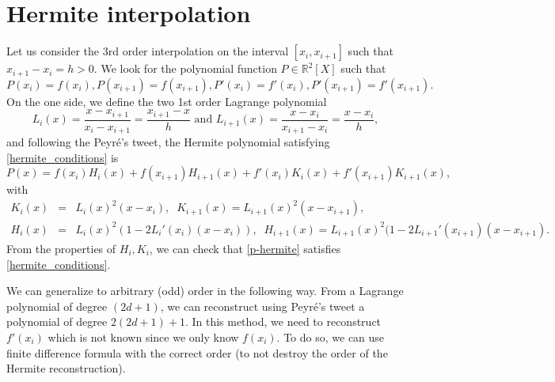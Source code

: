 \documentclass[12pt,english]{article}
\theoremstyle{plain}\newtheorem{theorem}{Theorem}[section]
\theoremstyle{plain}\newtheorem{corollary}{Corollary}[section]
\theoremstyle{plain}\newtheorem{lemma}{Lemma}[section]
\begin{document}
\section{Hermite interpolation}
\label{hemite}
Let us consider the 3rd order interpolation on the interval $[x_i, x_{i+1}]$ such that $x_{i+1}-x_i=h>0$. 
We look for the polynomial function $P\in \mathbb{R}^2[X]$ such that 
\begin{equation}
\label{hermite_conditions}
P(x_i) = f(x_i), P(x_{i+1}) = f(x_{i+1}), P'(x_i) = f'(x_i), P'(x_{i+1}) = f'(x_{i+1}).  
\end{equation} 
On the one side, we define the two 1st order Lagrange polynomial 
$$
L_i(x)=\frac{x-x_{i+1}}{x_i-x_{i+1}}  =\frac{x_{i+1}-x}{h}  \mbox{ and } L_{i+1}(x)=\frac{x-x_{i}}{x_{i+1}-x_{i}}=\frac{x-x_{i}}{h}, 
$$
and following the Peyr\'e's tweet, the Hermite polynomial satisfying \eqref{hermite_conditions} is 
\begin{equation}
\label{p-hermite}
P(x) = f(x_i)H_i(x) + f(x_{i+1})H_{i+1}(x)  + f'(x_i)K_i(x) + f'(x_{i+1})K_{i+1}(x),  
\end{equation}
with 
\begin{eqnarray}
\label{K_H}
K_i(x)&=&L_i(x)^2(x-x_i), \;\; K_{i+1}(x)=L_{i+1}(x)^2(x-x_{i+1}), \\
H_i(x)&=&L_i(x)^2(1-2L_i'(x_i)(x-x_i)), \;\; H_{i+1}(x)=L_{i+1}(x)^2(1-2L_{i+1}'(x_{i+1})(x-x_{i+1}). 
\end{eqnarray}
From the properties of $H_i, K_i$, we can check that \eqref{p-hermite} satisfies \eqref{hermite_conditions}. 

We can generalize to arbitrary (odd) order in the following way. 
From a Lagrange polynomial of degree $(2d+1)$, we can reconstruct using Peyr\'e's tweet 
a polynomial of degree $2(2d+1)+1$. 
In this method, we need to reconstruct $f'(x_i)$ which is not known since we only know $f(x_i)$. 
To do so, we can use finite difference formula with the correct order (to not destroy the order of the Hermite reconstruction). 
\end{document}
